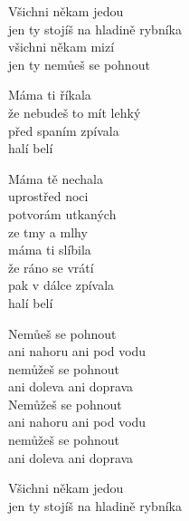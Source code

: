\cho{}
Všichni někam jedou\\
jen ty stojíš na hladině rybníka\\
všichni někam mizí\\
jen ty nemůeš se pohnout

\ve{}
Máma ti říkala\\
že nebudeš to mít lehký\\
před spaním zpívala\\
halí belí

\cho{}

\ve{}
Máma tě nechala\\
uprostřed noci\\
potvorám utkaných\\
ze tmy a mlhy\\
máma ti slíbila\\
že ráno se vrátí\\
pak v dálce zpívala\\
halí belí

\re{*:}
Nemůeš se pohnout\\
ani nahoru ani pod vodu\\
nemůžeš se pohnout\\
ani doleva ani doprava\\
Nemůžeš se pohnout\\
ani nahoru ani pod vodu\\
nemůžeš se pohnout\\
ani doleva ani doprava

\cho{}
Všichni někam jedou\\
jen ty stojíš na hladině rybníka

\esong